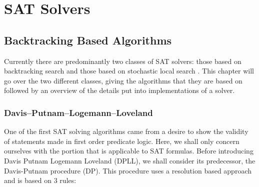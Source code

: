 
\chapter{SAT Solvers} \label{chap:solvers}

\ifpdf
    \graphicspath{{Chapter2/Figs/Raster/}{Chapter2/Figs/PDF/}{Chapter2/Figs/}}
\else
    \graphicspath{{Chapter2/Figs/Vector/}{Chapter2/Figs/}}
\fi


\section{Backtracking Based Algorithms}
Currently there are predominantly two classes of SAT solvers: those based on
backtracking search and those based on stochastic local search \cite{sat2018descriptions}. This chapter
will go over the two different classes, giving the algorithms that they are
based on followed by an overview of the details put into implementations of
a solver.

\subsection[DPLL]{Davis–Putnam–Logemann–Loveland} \label{sec:dpll}
One of the first SAT solving algorithms came from a desire to show the validity of
statements made in first order predicate logic. Here, we shall only concern ourselves
with the portion that is applicable to SAT formulas. Before introducing
Davis Putnam Logemann Loveland (DPLL),
we shall consider its predecessor,
the Davis-Putnam procedure (DP)\cite{davis1960computing}.
This procedure uses a resolution based approach and is based on 3 rules:

